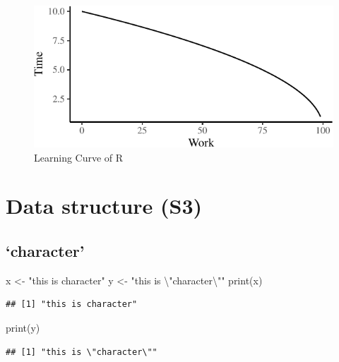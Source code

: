 \documentclass[
]{article}
\newenvironment{Shaded}{\begin{snugshade}}{\end{snugshade}}
\newcommand{\FunctionTok}[1]{\textcolor[rgb]{0.00,0.00,0.00}{#1}}
\newcommand{\NormalTok}[1]{#1}
\newcommand{\OtherTok}[1]{\textcolor[rgb]{0.56,0.35,0.01}{#1}}
\newcommand{\SpecialCharTok}[1]{\textcolor[rgb]{0.00,0.00,0.00}{#1}}
\newcommand{\StringTok}[1]{\textcolor[rgb]{0.31,0.60,0.02}{#1}}
\begin{document}
\begin{figure}
\centering
\includegraphics{Rtips2_files/figure-latex/fig2-1.pdf}
\caption{\label{fig:fig2}Learning Curve of R}
\end{figure}

\hypertarget{data-structure-s3}{%
\section{Data structure (S3)}\label{data-structure-s3}}

\hypertarget{character}{%
\subsection{`character'}\label{character}}

\begin{Shaded}
\begin{Highlighting}[]
\NormalTok{x }\OtherTok{\textless{}{-}} \StringTok{"this is character"}
\NormalTok{y }\OtherTok{\textless{}{-}} \StringTok{"this is }\SpecialCharTok{\textbackslash{}"}\StringTok{character}\SpecialCharTok{\textbackslash{}"}\StringTok{"}
\FunctionTok{print}\NormalTok{(x)}
\end{Highlighting}
\end{Shaded}

\begin{verbatim}
## [1] "this is character"
\end{verbatim}

\begin{Shaded}
\begin{Highlighting}[]
\FunctionTok{print}\NormalTok{(y)}
\end{Highlighting}
\end{Shaded}

\begin{verbatim}
## [1] "this is \"character\""
\end{verbatim}
\end{document}
